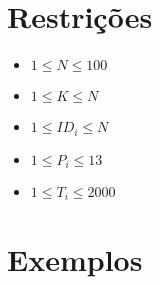 \section*{Restrições}

\begin{itemize}
\item $1 \leq N \leq 100$
\item $1 \leq K \leq N$
\item $1 \leq ID_i \leq N$
\item $1 \leq P_i \leq 13$
\item $1 \leq T_i \leq 2000$
\end{itemize}


\section*{Exemplos}

\exemplo
